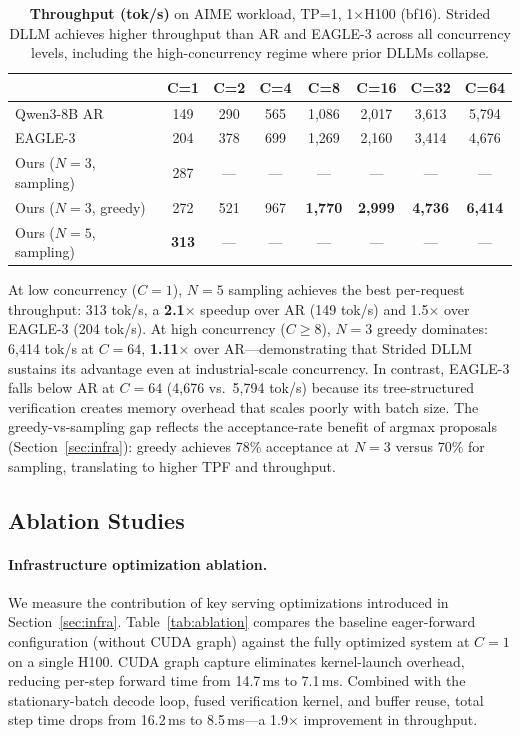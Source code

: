 \begin{table}[t]
\centering
\caption{\textbf{Throughput (tok/s)} on AIME workload, TP=1, 1$\times$H100 (bf16). Strided DLLM achieves higher throughput than AR and EAGLE-3 across all concurrency levels, including the high-concurrency regime where prior DLLMs collapse.}
\label{tab:throughput}
\small
\begin{tabular}{lccccccc}
\toprule
& C=1 & C=2 & C=4 & C=8 & C=16 & C=32 & C=64 \\
\midrule
Qwen3-8B AR & 149 & 290 & 565 & 1,086 & 2,017 & 3,613 & 5,794 \\
EAGLE-3 & 204 & 378 & 699 & 1,269 & 2,160 & 3,414 & 4,676 \\
Ours ($N{=}3$, sampling) & 287 & --- & --- & --- & --- & --- & --- \\
Ours ($N{=}3$, greedy) & 272 & 521 & 967 & \textbf{1,770} & \textbf{2,999} & \textbf{4,736} & \textbf{6,414} \\
Ours ($N{=}5$, sampling) & \textbf{313} & --- & --- & --- & --- & --- & --- \\
\bottomrule
\end{tabular}
\end{table}

At low concurrency ($C{=}1$), $N{=}5$ sampling achieves the best per-request throughput: 313 tok/s, a \textbf{2.1$\times$} speedup over AR (149 tok/s) and 1.5$\times$ over EAGLE-3 (204 tok/s). At high concurrency ($C{\geq}8$), $N{=}3$ greedy dominates: 6,414 tok/s at $C{=}64$, \textbf{1.11$\times$} over AR---demonstrating that Strided DLLM sustains its advantage even at industrial-scale concurrency. In contrast, EAGLE-3 falls below AR at $C{=}64$ (4,676 vs.\ 5,794 tok/s) because its tree-structured verification creates memory overhead that scales poorly with batch size. The greedy-vs-sampling gap reflects the acceptance-rate benefit of argmax proposals (Section~\ref{sec:infra}): greedy achieves 78\% acceptance at $N{=}3$ versus 70\% for sampling, translating to higher TPF and throughput.

\subsection{Ablation Studies}
\label{sec:ablation}

\paragraph{Infrastructure optimization ablation.}
We measure the contribution of key serving optimizations introduced in Section~\ref{sec:infra}. Table~\ref{tab:ablation} compares the baseline eager-forward configuration (without CUDA graph) against the fully optimized system at $C{=}1$ on a single H100. CUDA graph capture eliminates kernel-launch overhead, reducing per-step forward time from 14.7\,ms to 7.1\,ms. Combined with the stationary-batch decode loop, fused verification kernel, and buffer reuse, total step time drops from 16.2\,ms to 8.5\,ms---a 1.9$\times$ improvement in throughput.

